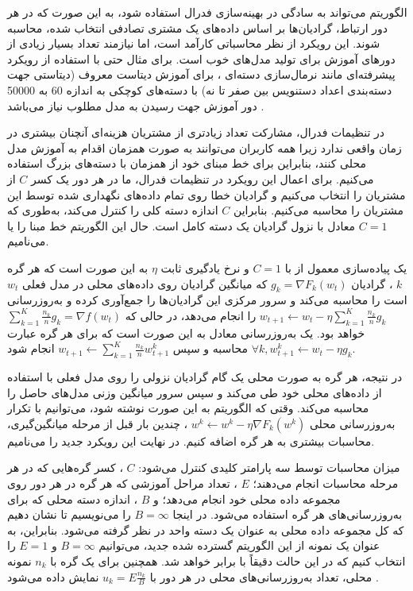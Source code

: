 الگوریتم
می‌تواند به سادگی در بهینه‌سازی فدرال استفاده شود، به این صورت که در هر دور ارتباط، گرادیان‌ها بر اساس داده‌های یک مشتری تصادفی انتخاب شده، محاسبه ‌شوند. این رویکرد از نظر محاسباتی کارآمد است، اما نیازمند تعداد بسیار زیادی از دورهای آموزش برای تولید مدل‌های خوب است.
برای مثال حتی با استفاده از رویکرد پیشرفته‌ای مانند نرمال‌سازی دسته‌ای%
%
، برای آموزش دیتاست معروف
(دیتاستی جهت دسته‌بندی اعداد دستنویس بین صفر تا نه)
با دسته‌های کوچکی به اندازه 60 به 50000 دور آموزش جهت رسیدن به مدل مطلوب نیاز می‌باشد
\cite{ioffe2015batch}.

در تنظیمات فدرال، مشارکت تعداد زیادتری از مشتریان هزینه‌ای آنچنان بیشتری در زمان واقعی ندارد زیرا همه کاربران می‌توانند به صورت همزمان اقدام به آموزش مدل محلی کنند، بنابراین برای خط مبنای خود از
همزمان با دسته‌های بزرگ استفاده می‌کنیم. برای اعمال این رویکرد در تنظیمات فدرال، ما در هر دور یک کسر
$C$
از مشتریان را انتخاب می‌کنیم و گرادیان خطا روی تمام داده‌های نگهداری شده توسط این مشتریان را محاسبه می‌کنیم. بنابراین
$C$
اندازه دسته‌ کلی را کنترل می‌کند، به‌طوری که
$C = 1$
معادل با نزول گرادیان یک دسته کامل است. حال این الگوریتم خط مبنا را
یا
می‌نامیم.

یک پیاده‌سازی معمول از
با
$C = 1$
و نرخ یادگیری ثابت
$\eta$
به این صورت است که هر گره
$k$%
، گرادیان
$g_k=\nabla F_k\left(w_t\right)$
که میانگین گرادیان روی داده‌های محلی در مدل فعلی
$w_t$
است را محاسبه می‌کند و سرور مرکزی این گرادیان‌ها را جمع‌آوری کرده و به‌روزرسانی
$w_{t+1} \leftarrow w_t-\eta \sum_{k=1}^K \frac{n_k}{n} g_k$
را انجام می‌دهد، در حالی که
$\sum_{k=1}^K \frac{n_k}{n} g_k=\nabla f\left(w_t\right)$
خواهد بود. یک به‌روزرسانی معادل به این صورت است که برای هر گره عبارت
$\forall k, w_{t+1}^k \leftarrow w_t-\eta g_k$
محاسبه و سپس
$w_{t+1} \leftarrow \sum_{k=1}^K \frac{n_k}{n} w_{t+1}^k$
انجام شود.

در نتیجه، هر گره به صورت محلی یک گام گرادیان نزولی را روی مدل فعلی با استفاده از داده‌های محلی خود طی می‌کند و سپس سرور میانگین وزنی مدل‌های حاصل را محاسبه می‌کند. وقتی که الگوریتم به این صورت نوشته شود، می‌توانیم با تکرار به‌روزرسانی محلی
$w^k \leftarrow w^k-\eta \nabla F_k\left(w^k\right)$%
، چندین بار قبل از مرحله میانگین‌گیری، محاسبات بیشتری به هر گره اضافه کنیم. در نهایت این رویکرد جدید را
می‌نامیم.

میزان محاسبات توسط سه پارامتر کلیدی کنترل می‌شود:
$C$%
، کسر گره‌هایی که در هر مرحله محاسبات انجام می‌دهند؛
$E$%
، تعداد مراحل آموزشی که هر گره در هر دور روی مجموعه داده محلی خود انجام می‌دهد؛ و
$B$%
، اندازه دسته محلی که برای به‌روزرسانی‌های هر گره استفاده می‌شود. در اینجا
$B = \infty$
را می‌نویسیم تا نشان دهیم که کل مجموعه داده محلی به عنوان یک دسته واحد در نظر گرفته می‌شود. بنابراین، به عنوان یک نمونه از این الگوریتم گسترده شده جدید، می‌توانیم
$B = \infty$
و
$E = 1$
را انتخاب کنیم که در این حالت دقیقاً با
برابر خواهد شد. همچنین برای یک گره با
$n_k$
نمونه محلی، تعداد به‌روزرسانی‌های محلی در هر دور با
$u_k=E \frac{n_k}{B}$
نمایش داده می‌شود
\cite{mcmahan2017communication}.



